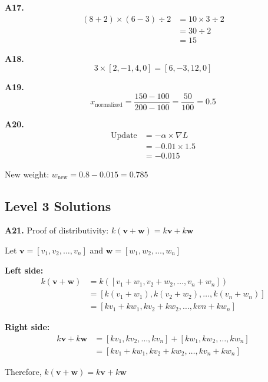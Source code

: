 \documentclass[11pt,a4paper]{article}
\begin{document}
\textbf{A17.}
\begin{align*}
    (8 + 2) \times (6 - 3) \div 2 &= 10 \times 3 \div 2 \\
    &= 30 \div 2 \\
    &= 15
\end{align*}

\textbf{A18.}
\begin{equation*}
    3 \times [2, -1, 4, 0] = [6, -3, 12, 0]
\end{equation*}

\textbf{A19.}
\begin{equation*}
    x_{\text{normalized}} = \frac{150 - 100}{200 - 100} = \frac{50}{100} = 0.5
\end{equation*}

\textbf{A20.}
\begin{align*}
    \text{Update} &= -\alpha \times \nabla L \\
    &= -0.01 \times 1.5 \\
    &= -0.015
\end{align*}

New weight: $w_{\text{new}} = 0.8 - 0.015 = 0.785$

\subsection{Level 3 Solutions}

\textbf{A21.} Proof of distributivity: $k(\mathbf{v} + \mathbf{w}) = k\mathbf{v} + k\mathbf{w}$

Let $\mathbf{v} = [v_1, v_2, \ldots, v_n]$ and $\mathbf{w} = [w_1, w_2, \ldots, w_n]$

\textbf{Left side:}
\begin{align*}
    k(\mathbf{v} + \mathbf{w}) &= k([v_1 + w_1, v_2 + w_2, \ldots, v_n + w_n]) \\
    &= [k(v_1 + w_1), k(v_2 + w_2), \ldots, k(v_n + w_n)] \\
    &= [kv_1 + kw_1, kv_2 + kw_2, \ldots, kvn + kw_n]
\end{align*}

\textbf{Right side:}
\begin{align*}
    k\mathbf{v} + k\mathbf{w} &= [kv_1, kv_2, \ldots, kv_n] + [kw_1, kw_2, \ldots, kw_n] \\
    &= [kv_1 + kw_1, kv_2 + kw_2, \ldots, kv_n + kw_n]
\end{align*}

Therefore, $k(\mathbf{v} + \mathbf{w}) = k\mathbf{v} + k\mathbf{w}$ \checkmark
\end{document}
